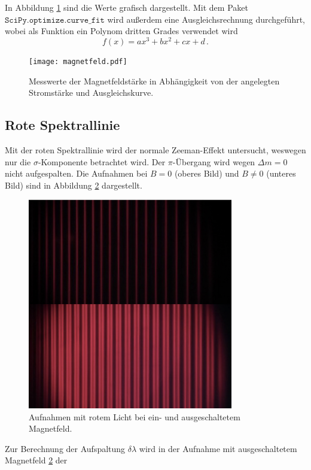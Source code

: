 \FloatBarrier
\noindent
In Abbildung \ref{fig:afig1} sind die Werte grafisch dargestellt. Mit dem Paket $\texttt{SciPy.optimize.curve\_fit}$ wird außerdem 
eine Ausgleichsrechnung durchgeführt, wobei als Funktion ein Polynom dritten Grades verwendet wird
\begin{equation*}
    f \left(x\right) = a x^3 +b x^2 +c x +d \, .
\end{equation*}
\FloatBarrier
\begin{figure}
    \centering
    \texttt{[image: magnetfeld.pdf]}
    \caption{Messwerte der Magnetfeldstärke in Abhängigkeit von der angelegten Stromstärke und Ausgleichskurve.}
    \label{fig:afig1}
\end{figure}
\FloatBarrier
\subsection{Rote Spektrallinie}
Mit der roten Spektrallinie wird der normale Zeeman-Effekt untersucht, weswegen nur die $\sigma$-Komponente betrachtet wird.
Der $\pi$-Übergang wird wegen $\Delta m = 0$ nicht aufgespalten.
Die Aufnahmen bei $B = 0$ (oberes Bild) und $B \neq 0$ (unteres Bild) sind in Abbildung \ref{fig:afig2} dargestellt.
\FloatBarrier
\begin{figure}
    \centering
    \includegraphics[width=0.8\textwidth]{rot.jpg}
    \caption{Aufnahmen mit rotem Licht bei ein- und ausgeschaltetem Magnetfeld.}
    \label{fig:afig2}
\end{figure}
\FloatBarrier
Zur Berechnung der Aufspaltung $\delta \lambda$ wird in der Aufnahme mit ausgeschaltetem Magnetfeld \ref{fig:afig2} der 
